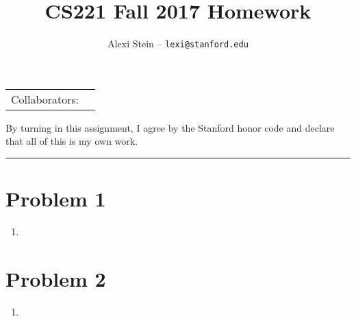 \documentclass[12pt]{article}
\title{CS221 Fall 2017 Homework }
\author{Alexi Stein -- \texttt{lexi@stanford.edu}}
\begin{document}
  \maketitle
  \begin{center}

  \vspace{-0.3in}
  \begin{tabular}{rl}
  Collaborators: & 
  \end{tabular}
  \end{center}

  By turning in this assignment, I agree by the Stanford honor code and declare
  that all of this is my own work.

  \noindent
  \rule{\linewidth}{0.4pt}
  
  \section*{Problem 1}

  \begin{enumerate}[label=(\alph*)]
    \item 
  \end{enumerate}

  \section*{Problem 2}

  \begin{enumerate}[label=(\alph*)]
    \item 
  \end{enumerate}
\end{document}
